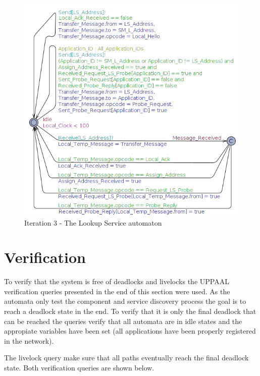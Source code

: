 \begin{figure}[ht]
    \centering
    \includegraphics[width=\textwidth]{figures/iteration3_ls}
    \caption{Iteration 3 - The Lookup Service automaton}
    \label{fig:iteration3_ls}
\end{figure}


\pagebreak
\section{Verification}
To verify that the system is free of deadlocks and livelocks the UPPAAL
verification queries presented in the end of this section were used. As the
automata only test the component and service discovery process the goal is to
reach a deadlock state in the end.  To verify that it is only the final
deadlock that can be reached the queries verify that all automata are in idle
states and the appropiate variables have been set (all applications have been
properly registered in the network).

The livelock query make sure that all paths eventually reach the final deadlock
state. Both verification queries are shown below.

